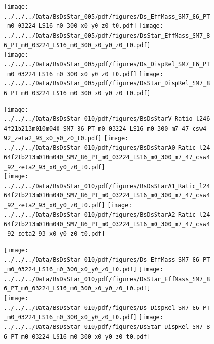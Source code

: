 \documentclass[a4paper,10pt]{article}
\begin{document}
\begin{figure}[p]
 \texttt{[image: ../../../Data/BsDsStar\_005/pdf/figures/Ds\_EffMass\_SM7\_86\_PT\_m0\_03224\_LS16\_m0\_300\_x0\_y0\_z0\_t0.pdf]}  
\texttt{[image: ../../../Data/BsDsStar\_005/pdf/figures/DsStar\_EffMass\_SM7\_86\_PT\_m0\_03224\_LS16\_m0\_300\_x0\_y0\_z0\_t0.pdf]} \\ 
\texttt{[image: ../../../Data/BsDsStar\_005/pdf/figures/Ds\_DispRel\_SM7\_86\_PT\_m0\_03224\_LS16\_m0\_300\_x0\_y0\_z0\_t0.pdf]}  
\texttt{[image: ../../../Data/BsDsStar\_005/pdf/figures/DsStar\_DispRel\_SM7\_86\_PT\_m0\_03224\_LS16\_m0\_300\_x0\_y0\_z0\_t0.pdf]} \\ 
\end{figure} 
\clearpage

\begin{figure}[p]
 \texttt{[image: ../../../Data/BsDsStar\_010/pdf/figures/BsDsStarV\_Ratio\_l2464f21b213m010m040\_SM7\_86\_PT\_m0\_03224\_LS16\_m0\_300\_m7\_47\_csw4\_92\_zeta2\_93\_x0\_y0\_z0\_t0.pdf]}  
\texttt{[image: ../../../Data/BsDsStar\_010/pdf/figures/BsDsStarA0\_Ratio\_l2464f21b213m010m040\_SM7\_86\_PT\_m0\_03224\_LS16\_m0\_300\_m7\_47\_csw4\_92\_zeta2\_93\_x0\_y0\_z0\_t0.pdf]} \\ 
\texttt{[image: ../../../Data/BsDsStar\_010/pdf/figures/BsDsStarA1\_Ratio\_l2464f21b213m010m040\_SM7\_86\_PT\_m0\_03224\_LS16\_m0\_300\_m7\_47\_csw4\_92\_zeta2\_93\_x0\_y0\_z0\_t0.pdf]}  
\texttt{[image: ../../../Data/BsDsStar\_010/pdf/figures/BsDsStarA2\_Ratio\_l2464f21b213m010m040\_SM7\_86\_PT\_m0\_03224\_LS16\_m0\_300\_m7\_47\_csw4\_92\_zeta2\_93\_x0\_y0\_z0\_t0.pdf]} \\ 
\end{figure} 
\clearpage

\begin{figure}[p]
 \texttt{[image: ../../../Data/BsDsStar\_010/pdf/figures/Ds\_EffMass\_SM7\_86\_PT\_m0\_03224\_LS16\_m0\_300\_x0\_y0\_z0\_t0.pdf]}  
\texttt{[image: ../../../Data/BsDsStar\_010/pdf/figures/DsStar\_EffMass\_SM7\_86\_PT\_m0\_03224\_LS16\_m0\_300\_x0\_y0\_z0\_t0.pdf]} \\ 
\texttt{[image: ../../../Data/BsDsStar\_010/pdf/figures/Ds\_DispRel\_SM7\_86\_PT\_m0\_03224\_LS16\_m0\_300\_x0\_y0\_z0\_t0.pdf]}  
\texttt{[image: ../../../Data/BsDsStar\_010/pdf/figures/DsStar\_DispRel\_SM7\_86\_PT\_m0\_03224\_LS16\_m0\_300\_x0\_y0\_z0\_t0.pdf]} \\ 
\end{figure} 
\clearpage
\end{document}
